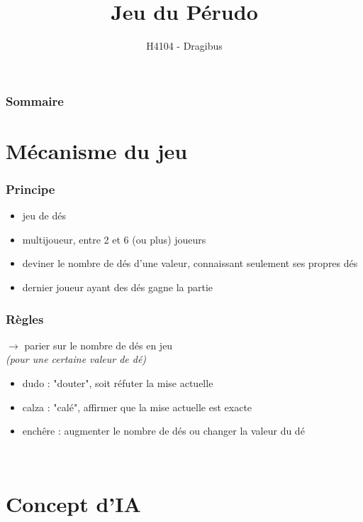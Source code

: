 \documentclass{beamer}
\title{Jeu du Pérudo}
\author{H4104 - Dragibus}
\institute{INSA de Lyon}
\begin{document}
\begin{frame}
  \titlepage
\end{frame}

\begin{frame}
  \frametitle{Sommaire}
  \tableofcontents[hideallsubsections]
\end{frame}

\section{Mécanisme du jeu}

\begin{frame}
  \frametitle{Principe}


  \begin{itemize}
    \item jeu de dés
    \item multijoueur, entre 2 et 6 (ou plus) joueurs
    \item deviner le nombre de dés d'une valeur, connaissant seulement ses
      propres dés
    \item dernier joueur ayant des dés gagne la partie
  \end{itemize}
\end{frame}

\begin{frame}
  \frametitle{Règles}
  $\to$ parier sur le nombre de dés en jeu \\
  \emph{(pour une certaine valeur de dé)}

  \begin{itemize}
    \item dudo : "douter", soit réfuter la mise actuelle
    \item calza : "calé", affirmer que la mise actuelle est exacte
    \item enchêre : augmenter le nombre de dés ou changer la valeur du dé
  \end{itemize}

  \\[5mm]
\end{frame}

\section{Concept d'IA}
\end{document}
